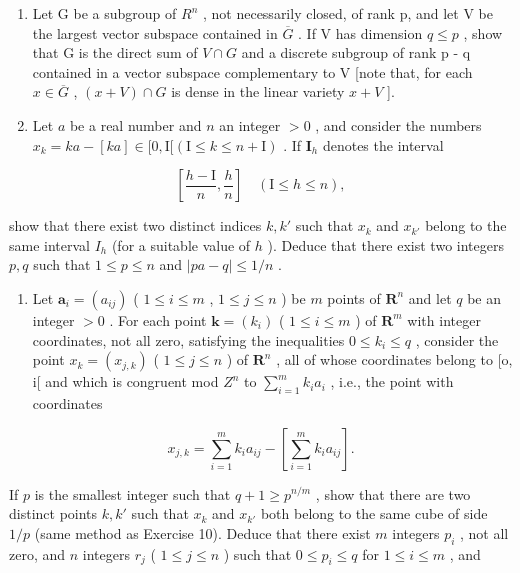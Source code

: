 \begin{enumerate}
\def\labelenumi{\arabic{enumi})}
\setcounter{enumi}{8}
\item
  Let G be a subgroup of \(R^{n}\) , not necessarily closed, of rank p, and let V be the largest vector subspace contained in \(\overline{G}\) . If V has dimension \(q \leqslant p\) , show that G is the direct sum of \(V \cap G\) and a discrete subgroup of rank p - q contained in a vector subspace complementary to V {[}note that, for each \(x \in \overline{G}\) , \((x + V) \cap G\) is dense in the linear variety \(x + V\) {]}.
\item
  Let \(a\) be a real number and \(n\) an integer \(>0\) , and consider the numbers \(x_{k} = ka - [ka] \in [0, \mathrm{I}[(\mathrm{I} \leqslant k \leqslant n + \mathrm{I})\) . If \(\mathbf{I}_h\) denotes the interval
\end{enumerate}

\[
\left[ \frac {h - \mathrm{I}}{n}, \frac {h}{n} \right] \quad (\mathrm{I} \leqslant h \leqslant n),
\]

show that there exist two distinct indices \(k, k'\) such that \(x_k\) and \(x_{k'}\) belong to the same interval \(I_h\) (for a suitable value of \(h\) ). Deduce that there exist two integers \(p, q\) such that \(1 \leqslant p \leqslant n\) and \(|pa - q| \leqslant 1 / n\) .

\begin{enumerate}
\def\labelenumi{\Roman{enumi})}
\setcounter{enumi}{1}
\tightlist
\item
  Let \(\boldsymbol{a}_i = (a_{ij})\) ( \(1 \leqslant i \leqslant m\) , \(1 \leqslant j \leqslant n\) ) be \(m\) points of \(\mathbf{R}^n\) and let \(q\) be an integer \(>0\) . For each point \(\boldsymbol{k} = (k_i)\) ( \(1 \leqslant i \leqslant m\) ) of \(\mathbf{R}^m\) with integer coordinates, not all zero, satisfying the inequalities \(0 \leqslant k_i \leqslant q\) , consider the point \(x_k = (x_{j,k})\) ( \(1 \leqslant j \leqslant n\) ) of \(\mathbf{R}^n\) , all of whose coordinates belong to {[}o, i{[} and which is congruent mod \(Z^n\) to \(\sum_{i=1}^{m} k_i a_i\) , i.e., the point with coordinates
\end{enumerate}

\[
x _ {j, k} = \sum_ {i = 1} ^ {m} k _ {i} a _ {i j} - \left[ \sum_ {i = 1} ^ {m} k _ {i} a _ {i j} \right].
\]

If \(p\) is the smallest integer such that \(q + 1 \geqslant p^{n/m}\) , show that there are two distinct points \(k, k'\) such that \(x_k\) and \(x_{k'}\) both belong to the same cube of side \(1/p\) (same method as Exercise 10). Deduce that there exist \(m\) integers \(p_i\) , not all zero, and \(n\) integers \(r_j\) ( \(1 \leqslant j \leqslant n\) ) such that \(0 \leqslant p_i \leqslant q\) for \(1 \leqslant i \leqslant m\) , and

